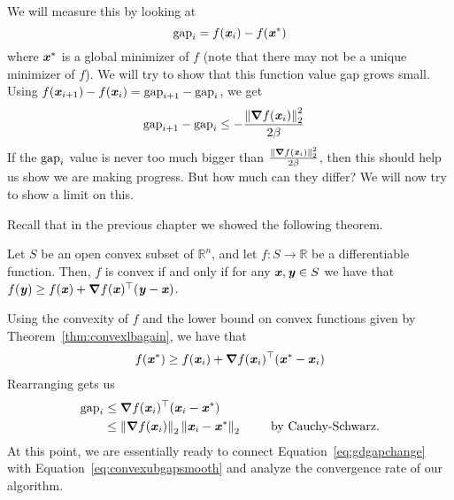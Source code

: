 We will measure this by looking at
\[
  \text{gap}_i =  f(\boldsymbol{\mathit{x}}_{i}) - f(\boldsymbol{\mathit{x}}^*)
  \]
  where $\boldsymbol{\mathit{x}}^*$ is a global minimizer of $f$ (note that there may not
  be a unique minimizer of $f$).
We will try to show that this function value gap grows small.
Using $f(\boldsymbol{\mathit{x}}_{i+1})- f(\boldsymbol{\mathit{x}}_{i}) =
  \text{gap}_{i+1}- \text{gap}_i $, we get
\begin{align}
\label{eq:gdgapchange}
 \text{gap}_{i+1}- \text{gap}_i &\leq - \frac{\left\| \boldsymbol{\nabla}
  f(\boldsymbol{\mathit{x}}_{i}) \right\|_2^2}{2\beta}
\end{align}
If the $\text{gap}_i$  value is never too much bigger than $\frac{\left\| \boldsymbol{\nabla}
  f(\boldsymbol{\mathit{x}}_{i}) \right\|_2^2}{2\beta}$, then this should help us show we are making
progress.
But how much can they differ? We will now try to show a limit on this.

Recall that in the previous chapter we showed the following theorem.
\begin{theorem}\label{thm:convexlbagain}
Let  $S$ be an open convex subset of $\mathbb{R}^n$, and
let $f:S\to \mathbb{R}$ be a differentiable function.
Then, $f$ is convex if and only if for any $\boldsymbol{\mathit{x}},\boldsymbol{\mathit{y}} \in S$ we have that $f(\boldsymbol{\mathit{y}}) \geq f(\boldsymbol{\mathit{x}}) + \boldsymbol{\nabla} f(\boldsymbol{\mathit{x}})^\top  (\boldsymbol{\mathit{y}}-\boldsymbol{\mathit{x}})$.
\end{theorem}


Using the convexity of $f$ and the lower bound on
convex functions given by Theorem~\ref{thm:convexlbagain}, we have that
\begin{align}
\label{eq:basiciterlb}
f(\boldsymbol{\mathit{x}}^*) \geq f(\boldsymbol{\mathit{x}}_i) + \boldsymbol{\nabla} f(\boldsymbol{\mathit{x}}_{i})^\top (\boldsymbol{\mathit{x}}^* - \boldsymbol{\mathit{x}}_i)
\end{align}
Rearranging gets us
\begin{align}
\label{eq:convexubgapsmooth}
  \text{gap}_i &\leq \boldsymbol{\nabla} f(\boldsymbol{\mathit{x}}_{i})^\top (\boldsymbol{\mathit{x}}_i - \boldsymbol{\mathit{x}}^*)
  \\
 & \leq \left\| \boldsymbol{\nabla} f(\boldsymbol{\mathit{x}}_{i}) \right\|_2 \left\| \boldsymbol{\mathit{x}}_i - \boldsymbol{\mathit{x}}^* \right\|_2
            \tag*{ by Cauchy-Schwarz.}
\end{align}
At this point, we are essentially ready to connect
Equation~\eqref{eq:gdgapchange} with Equation~\eqref{eq:convexubgapsmooth}
and analyze the convergence rate of our algorithm.


